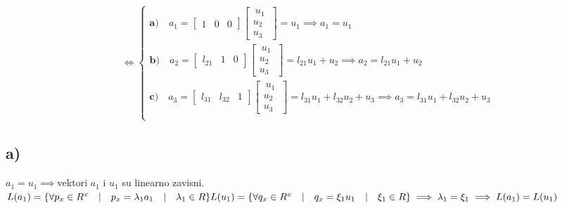 \documentclass[11pt]{article}
\begin{document}
\begin{align*}
\tag{4.1}\label{eq4.1}
\\
\iff \begin{cases}
\boldsymbol{a)} \quad a_1 =
\begin{bmatrix}
1 & 0 & 0
\end{bmatrix}
\begin{bmatrix}
\ u_1\ \\\hline
u_2\\\hline
u_3
\end{bmatrix} = u_1 \implies a_1=u_1\\
\boldsymbol{b)} \quad a_2=
\begin{bmatrix}
l_{21} & 1 & 0
\end{bmatrix}
\begin{bmatrix}
\ u_1\ \\\hline
u_2\\\hline
u_3
\end{bmatrix} = l_{21}u_1 + u_2 \implies a_2=l_{21}u_1+u_2\\
\boldsymbol{c)} \quad a_3=
\begin{bmatrix}
l_{31} & l_{32} & 1
\end{bmatrix}
\begin{bmatrix}
\ u_1\ \\\hline
u_2\\\hline
u_3
\end{bmatrix} = l_{31}u_1 + l_{32}u_2 + u_3 \implies a_3=l_{31}u_1+l_{32}u_2+u_3\\
\end{cases}
\end{align*}
\subsection*{a)}
$a_1=u_1 \implies  $vektori $a_1$ i $u_1$ su linearno zavisni. \\$ L(a_1)=\{\forall p_x \in R^x\quad | \quad p_x=\lambda_1 a_1 \quad | \quad \lambda_1 \in R\}\\L(u_1)=\{\forall q_x \in R^x\quad | \quad q_x=\xi_1 u_1 \quad | \quad \xi_1 \in R\}\vspace{3mm}\\
\implies \lambda_1 =\xi_1 \implies L(a_1)=L(u_1)$
\end{document}

